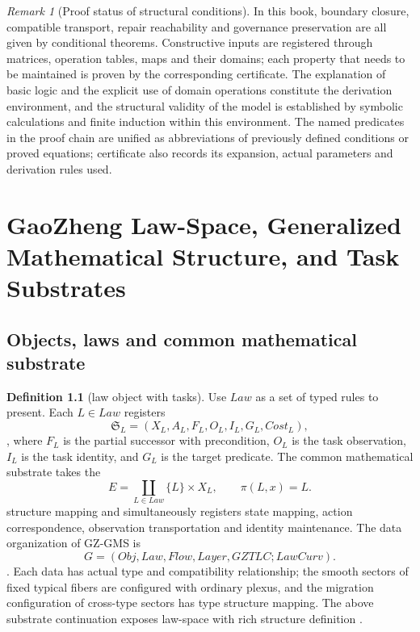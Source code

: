 \documentclass[12pt,a4paper,openany,notitlepage]{report}
\theoremstyle{plain}
\theoremstyle{definition}
\newtheorem{definition}[theorem]{Definition}
\theoremstyle{remark}
\newtheorem{remark}[theorem]{Remark}
\def\mathcal#1{#1}\def\mathsf#1{#1}\def\mathbb#1{#1}%
\begin{document}
\begin{CJK*}
\begin{remark}
[Proof status of structural conditions]In this book, boundary closure, compatible transport, repair reachability and governance preservation are all given by conditional theorems. Constructive inputs are registered through matrices, operation tables, maps and their domains; each property that needs to be maintained is proven by the corresponding certificate. The explanation of basic logic and the explicit use of domain operations constitute the derivation environment, and the structural validity of the model is established by symbolic calculations and finite induction within this environment. The named predicates in the proof chain are unified as abbreviations of previously defined conditions or proved equations; certificate also records its expansion, actual parameters and derivation rules used.\end{remark}


\chapter{GaoZheng Law-Space, Generalized Mathematical Structure, and Task Substrates}
\label{exp:ch:law}


\label{hgov:sec:law}

\section { Objects, laws and common mathematical substrate }

\begin{definition}
[law object with tasks]\label{hgov:def:law}
Use $\mathsf{Law}$ as a set of typed rules to present. Each $L\in\mathsf{Law}$ registers \[
\mathfrak S_L=(X_L,A_L,F_L,O_L,I_L,G_L,\mathsf{Cost}_L),
\], where $F_L$ is the partial successor with precondition, $O_L$ is the task observation, $I_L$ is the task identity, and $G_L$ is the target predicate. The common mathematical substrate takes the \[
\mathcal E=\coprod_{L\in\mathsf{Law}}\{L\}\times X_L,
\qquad \pi(L,x)=L.
\] structure mapping and simultaneously registers state mapping, action correspondence, observation transportation and identity maintenance. The data organization of GZ-GMS is \[
\mathcal G=(\mathsf{Obj},\mathsf{Law},\mathsf{Flow},
\mathsf{Layer},\mathsf{GZTLC};\mathsf{LawCurv}).
\]. Each data has actual type and compatibility relationship; the smooth sectors of fixed typical fibers are configured with ordinary plexus, and the migration configuration of cross-type sectors has type structure mapping. The above substrate continuation exposes law-space with rich structure definition \cite{S01,S38} .\end{definition}



\end{CJK*}
\end{document}

